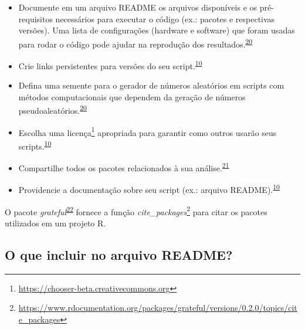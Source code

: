 \documentclass[
  a4paper,
]{book}
\renewcommand{\href}[2]{#2\footnote{\url{#1}}}
\newenvironment{infobox}[1]
  {
  \begin{itemize}
  \renewcommand{\labelitemi}{
    \raisebox{-.7\height}[0pt][0pt]{
      {\setkeys{Gin}{width=3em,keepaspectratio}
        \texttt{[image: \#1]}}
    }
  }
  \setlength{\fboxsep}{1em}
  \begin{blackbox}
  \item
  }
  {
  \end{blackbox}
  \end{itemize}
  }
\begin{document}
\begin{itemize}
\item
  Documente em um arquivo README os arquivos disponíveis e os pré-requisitos necessários para executar o código (ex.: pacotes e respectivas versões). Uma lista de configurações (hardware e software) que foram usadas para rodar o código pode ajudar na reprodução dos resultados.\textsuperscript{\protect\hyperlink{ref-hofner2015}{20}}
\item
  Crie links persistentes para versões do seu script.\textsuperscript{\protect\hyperlink{ref-Eglen2017}{10}}
\item
  Defina uma semente para o gerador de números aleatórios em scripts com métodos computacionais que dependem da geração de números pseudoaleatórios.\textsuperscript{\protect\hyperlink{ref-hofner2015}{20}}
\item
  Escolha uma \href{https://chooser-beta.creativecommons.org}{licença} apropriada para garantir como outros usarão seus scripts.\textsuperscript{\protect\hyperlink{ref-Eglen2017}{10}}
\item
  Compartilhe todos os pacotes relacionados à sua análise.\textsuperscript{\protect\hyperlink{ref-Zhao2023}{21}}
\item
  Providencie a documentação sobre seu script (ex.: arquivo README).\textsuperscript{\protect\hyperlink{ref-Eglen2017}{10}}
\end{itemize}

\begin{infobox}{images/Rlogo}
O pacote \emph{grateful}\textsuperscript{\protect\hyperlink{ref-grateful}{22}} fornece a função \href{https://www.rdocumentation.org/packages/grateful/versions/0.2.0/topics/cite_packages}{\emph{cite\_packages}} para citar os pacotes utilizados em um projeto R.

\end{infobox}

\hypertarget{o-que-incluir-no-arquivo-readme}{%
\subsection{O que incluir no arquivo README?}\label{o-que-incluir-no-arquivo-readme}}
\end{document}
